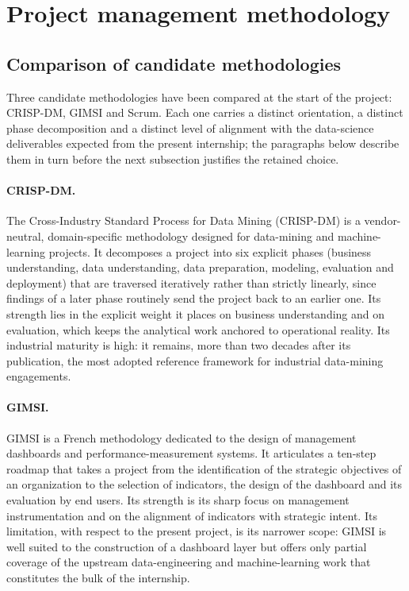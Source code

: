 \section{Project management methodology}

\subsection{Comparison of candidate methodologies}
Three candidate methodologies have been compared at the start of the project: CRISP-DM, GIMSI and Scrum. Each one carries a distinct orientation, a distinct phase decomposition and a distinct level of alignment with the data-science deliverables expected from the present internship; the paragraphs below describe them in turn before the next subsection justifies the retained choice.

\paragraph{CRISP-DM.} The Cross-Industry Standard Process for Data Mining (CRISP-DM) is a vendor-neutral, domain-specific methodology designed for data-mining and machine-learning projects. It decomposes a project into six explicit phases (business understanding, data understanding, data preparation, modeling, evaluation and deployment) that are traversed iteratively rather than strictly linearly, since findings of a later phase routinely send the project back to an earlier one. Its strength lies in the explicit weight it places on business understanding and on evaluation, which keeps the analytical work anchored to operational reality. Its industrial maturity is high: it remains, more than two decades after its publication, the most adopted reference framework for industrial data-mining engagements.

\paragraph{GIMSI.} GIMSI is a French methodology dedicated to the design of management dashboards and performance-measurement systems. It articulates a ten-step roadmap that takes a project from the identification of the strategic objectives of an organization to the selection of indicators, the design of the dashboard and its evaluation by end users. Its strength is its sharp focus on management instrumentation and on the alignment of indicators with strategic intent. Its limitation, with respect to the present project, is its narrower scope: GIMSI is well suited to the construction of a dashboard layer but offers only partial coverage of the upstream data-engineering and machine-learning work that constitutes the bulk of the internship.

